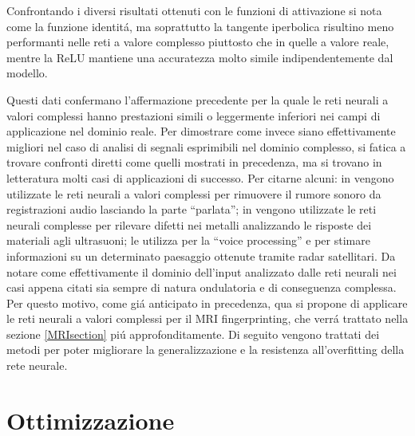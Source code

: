 \documentclass[a4paper,12pt]{report}
\begin{document}
 Confrontando i diversi risultati ottenuti con le funzioni di attivazione si nota come la funzione identit\'a, ma soprattutto la tangente iperbolica risultino meno performanti nelle reti a valore complesso piuttosto che in quelle a valore reale, mentre la ReLU mantiene una accuratezza molto simile indipendentemente dal modello.
 
 Questi dati confermano l'affermazione precedente per la quale le reti neurali a valori complessi hanno prestazioni simili o leggermente inferiori nei campi di applicazione nel dominio reale. Per dimostrare come invece siano effettivamente migliori nel caso di analisi di segnali esprimibili nel dominio complesso, si fatica a trovare confronti diretti come quelli mostrati in precedenza, ma si trovano in letteratura molti casi di applicazioni di successo. Per citarne alcuni: in \cite{sarroff} vengono utilizzate le reti neurali a valori complessi per rimuovere il rumore sonoro da registrazioni audio lasciando la parte ``parlata''; in \cite{birx1993complex} vengono utilizzate le reti neurali complesse per rilevare difetti nei metalli analizzando le risposte dei materiali agli ultrasuoni; \cite{sawada2003polar} le utilizza per la ``voice processing'' e \cite{yamaki2008singular}  per stimare informazioni su un determinato paesaggio ottenute tramite radar satellitari. Da notare come effettivamente il dominio dell'input analizzato dalle reti neurali nei casi appena citati sia sempre di natura ondulatoria e di conseguenza complessa. Per questo motivo, come gi\'a anticipato in precedenza, qua si propone di applicare le reti neurali a valori complessi per il MRI fingerprinting, che verr\'a trattato nella sezione \ref{MRIsection} pi\'u approfonditamente. 
 Di seguito vengono trattati dei metodi per poter migliorare la generalizzazione e la resistenza all'overfitting della rete neurale.



 



 
 \chapter*{Ottimizzazione}
\end{document}
